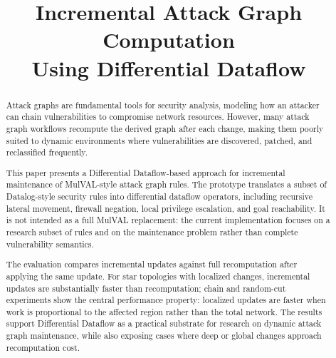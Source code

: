 \documentclass[conference]{IEEEtran}
\begin{document}
\title{Incremental Attack Graph Computation\\Using Differential Dataflow}

\author{
\and
{}
}

\maketitle

\begin{abstract}
Attack graphs are fundamental tools for security analysis, modeling how an attacker can chain vulnerabilities to compromise network resources. However, many attack graph workflows recompute the derived graph after each change, making them poorly suited to dynamic environments where vulnerabilities are discovered, patched, and reclassified frequently.

This paper presents a Differential Dataflow-based approach for incremental maintenance of MulVAL-style attack graph rules. The prototype translates a subset of Datalog-style security rules into differential dataflow operators, including recursive lateral movement, firewall negation, local privilege escalation, and goal reachability. It is not intended as a full MulVAL replacement: the current implementation focuses on a research subset of rules and on the maintenance problem rather than complete vulnerability semantics.

The evaluation compares incremental updates against full recomputation after applying the same update. For star topologies with localized changes, incremental updates are substantially faster than recomputation; chain and random-cut experiments show the central performance property: localized updates are faster when work is proportional to the affected region rather than the total network. The results support Differential Dataflow as a practical substrate for research on dynamic attack graph maintenance, while also exposing cases where deep or global changes approach recomputation cost.
\end{abstract}
\end{document}
